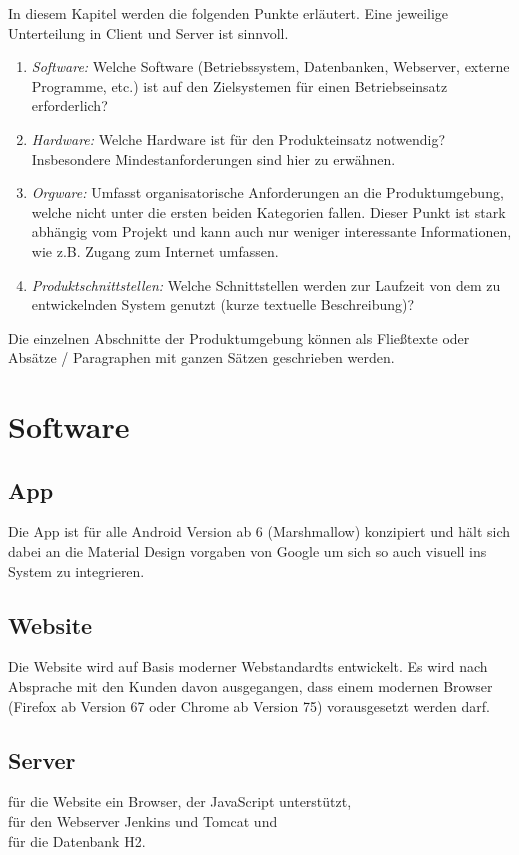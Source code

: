 \begin{tcolorbox}
In diesem Kapitel werden die folgenden Punkte erläutert. Eine jeweilige Unterteilung in Client und Server ist sinnvoll.
\begin{enumerate}
	\item \textit{Software:} Welche Software (Betriebssystem, Datenbanken, Webserver, externe Programme, etc.) ist auf den Zielsystemen für einen Betriebseinsatz erforderlich?
	\item \textit{Hardware:} Welche Hardware ist für den Produkteinsatz notwendig? Insbesondere Mindestanforderungen sind hier zu erwähnen.
	\item \textit{Orgware:} Umfasst organisatorische Anforderungen an die Produktumgebung, welche nicht unter die ersten beiden Kategorien fallen. 
	Dieser Punkt ist stark abhängig vom Projekt und kann auch nur weniger interessante Informationen, wie z.B. Zugang zum Internet umfassen.
	\item \textit{Produktschnittstellen:} Welche Schnittstellen werden zur Laufzeit von dem zu entwickelnden System genutzt (kurze textuelle Beschreibung)?
\end{enumerate}

\noindent Die einzelnen Abschnitte der Produktumgebung können als Fließtexte oder Absätze / Paragraphen mit ganzen Sätzen geschrieben werden.
\end{tcolorbox}

\section{Software}

\subsection{App}
Die App ist für alle Android Version ab 6 (Marshmallow) konzipiert und hält sich dabei an die Material Design vorgaben von Google um sich so auch visuell ins System zu integrieren.

\subsection{Website}
Die Website wird auf Basis moderner Webstandardts entwickelt. Es wird nach Absprache mit den Kunden davon ausgegangen, dass einem modernen Browser (Firefox ab Version 67 oder Chrome ab Version 75) vorausgesetzt werden darf.

\subsection{Server} 
für die Website ein Browser, der JavaScript unterstützt, \\
für den Webserver Jenkins und Tomcat und \\
für die Datenbank H2.\\

